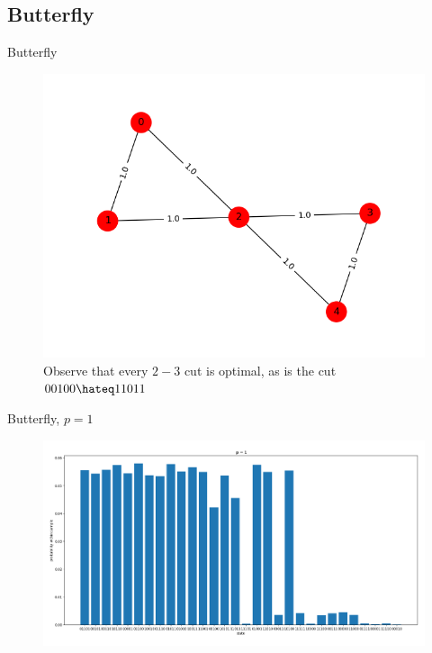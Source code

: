 \documentclass{beamer}
\begin{document}
\subsection{Butterfly}
\begin{frame}{Butterfly}
	\begin{figure}
		\includegraphics[scale=0.6]{figures/butterfly-graph.png}
		\caption*{Observe that every $2-3$ cut is optimal, as is the cut $00100 \hateq 11011$}
	\end{figure}
\end{frame}

\begin{frame}{Butterfly, $p = 1$}
\begin{figure}
	\centering
	\includegraphics[scale=0.3,left]{figures/butterfly-p1.png}
\end{figure}
\end{frame}
\end{document}
